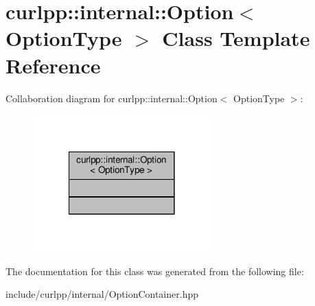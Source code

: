 \hypertarget{classcurlpp_1_1internal_1_1Option}{\section{curlpp\-:\-:internal\-:\-:Option$<$ Option\-Type $>$ Class Template Reference}
\label{classcurlpp_1_1internal_1_1Option}
}


Collaboration diagram for curlpp\-:\-:internal\-:\-:Option$<$ Option\-Type $>$\-:
\nopagebreak
\begin{figure}[H]
\begin{center}
\leavevmode
\includegraphics[width=194pt]{classcurlpp_1_1internal_1_1Option__coll__graph}
\end{center}
\end{figure}


The documentation for this class was generated from the following file\-:\begin{DoxyCompactItemize}
\item 
include/curlpp/internal/Option\-Container.\-hpp\end{DoxyCompactItemize}
